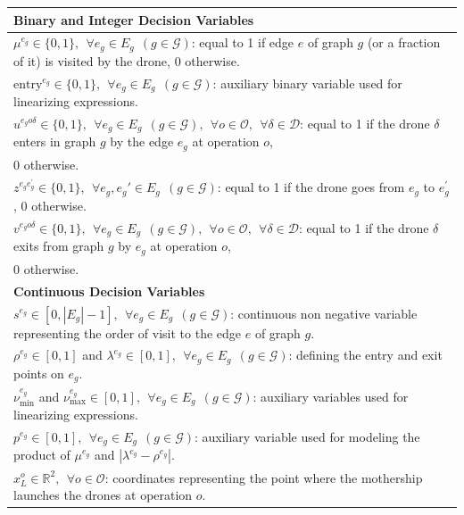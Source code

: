 \documentclass[10pt,a4paper]{elsarticle}
\newcommand{\EN}[1]{{\color{black}#1}}
\begin{document}
\begin{table}[h!]
	\scriptsize
	\centering
	\begin{tabular}{|l|}
		\hline 
		\textbf{Binary and Integer Decision Variables}\\
		\hline
		$\mu^{e_g} \in \{0,1\}, \:\: \forall e_g \in E_g\:\: (g \in \mathcal{G})$: equal to 1 if edge $e$ of graph $g$ (or a fraction of it) is visited by the drone, 0 otherwise.\\
		$\text{entry}^{e_g} \in \{0,1\}, \:\: \forall e_g \in E_g\:\: (g \in \mathcal{G})$: auxiliary binary variable used for linearizing expressions.\\
		$u^{e_{g}o\delta} \in \{0,1\}, \:\: \forall e_g \in E_g\:\: (g \in \mathcal{G}), \:\:\forall o \in \mathcal O, \:\: \forall \delta \in \mathcal D$: equal to 1 if the drone $\delta$ enters in graph $g$ by the edge $e_g$ at operation $o$,\\ \hspace*{1cm} 0 otherwise.\\
		$z^{e_{g}e^{'}_{g}} \in \{0,1\}, \:\: \forall e_g, e_g' \in E_g\:\: (g \in \mathcal{G})$: equal to 1 if the drone goes from $e_g$ to $e^{'}_{g}$, 0 otherwise.\\
		$v^{e_{g}o\delta} \in \{0,1\}, \:\: \forall e_g \in E_g\:\: (g \in \mathcal{G}), \:\: \forall o \in \mathcal O, \:\: \forall \delta \in \mathcal D$: equal to 1 if the drone $\delta$ exits from graph $g$ by $e_g$ at operation $o$,\\ \hspace*{1cm} 0 otherwise.\\
		\hline
		\textbf{Continuous Decision Variables}\\
		\hline
		$s^{e_g}\in[0, |E_g|-1],\:\: \forall e_g \in E_g\:\: (g \in \mathcal{G})$: continuous non negative variable representing the order of visit \EN{to} the edge $e$ of graph $g$.\\
		$\rho^{e_g} \in [0,1]$ and $\lambda^{e_g} \in [0,1], \:\: \forall e_g \in E_g\:\: (g \in \mathcal{G})$: defining the entry and exit points on $e_g$.\\
		$\nu_\text{min}^{e_g}$ and $\nu_\text{max}^{e_g} \in [0,1], \:\: \forall e_g \in E_g\:\: (g \in \mathcal{G})$: auxiliary variables used for linearizing expressions.\\
		$p^{e_g}\in [0, 1], \:\: \forall e_g \in E_g\:\: (g \in \mathcal G)$: auxiliary variable used for modeling the product of $\mu^{e_g}$ and $|\lambda^{e_g}-\rho^{e_g}|$.\\
		$x_L^o\in\mathbb R^2, \:\: \forall o \in \mathcal O$: coordinates representing the point where the mothership launches the drones at operation $o$.\\

\end{tabular}
\end{table}
\end{document}
